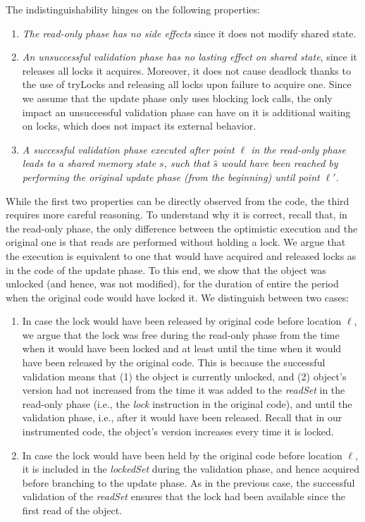 \noindent
The indistinguishability hinges on the following properties:
\begin{enumerate}
\item \emph{The read-only phase has no side effects} since it does not modify shared state.
\item \emph{An unsuccessful validation phase has no lasting effect on shared state}, 
since it releases all locks it acquires. Moreover, it does not cause deadlock thanks to the use of tryLocks 
and releasing all locks	upon failure to acquire one. Since we assume that the update phase only uses 
blocking lock calls, the only impact an unsuccessful validation phase can have on it is additional waiting
on locks, which does not impact its external behavior. 
\item \emph{A successful validation phase 
executed after point $\ell$ in the read-only phase 
leads to a shared memory state $s$, such that $\hat{s}$ 
would have been reached by performing the original 
update phase (from the beginning) until point $\ell'$}.
\end{enumerate}

While the first two properties can be directly observed from the code, the third requires more careful reasoning.
To understand why it is correct, recall that, in the read-only phase,  
the only difference between the optimistic execution and the original one is that reads are performed without 
holding a lock. We argue that the execution is equivalent to one that would have acquired and released
locks as in the code of the update phase. To this end, we show that the object was unlocked 
(and hence, was not modified), for the duration of entire the period when the original code would have locked it.
We distinguish between two cases:
\begin{enumerate}
\item In case the lock would have been released by original code before location $\ell$, 
we argue that the lock was free during the read-only phase from the time when it would have been locked
and at least until the time when it would have been released by the original code.
This is because the successful validation means that (1) the object is currently
unlocked, and (2) object's version had not increased from the time it was added to the \emph{readSet} in the read-only phase
(i.e., the \emph{lock} instruction in the original code), and until the 
validation phase, i.e., after it would have 
been released. Recall that in our instrumented code, the object's version increases every time it is locked.
\item In case the lock would have been held by the original code before location $\ell$, it is included in
the \emph{lockedSet} during the validation phase, and hence acquired before branching to the update phase.
As in the previous case, the successful validation of the \emph{readSet} ensures that the lock had been
available since the first read of the object.
\end{enumerate}

